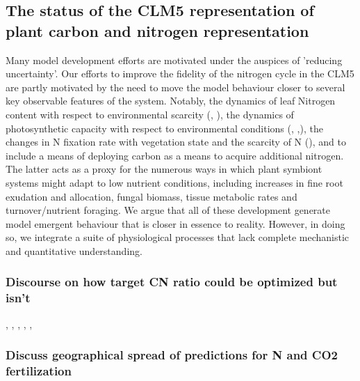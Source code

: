 \documentclass[draft,linenumbers]{agujournal}
\begin{document}
{\subsection{The status of the CLM5 representation of plant carbon and nitrogen representation}
Many model development efforts are motivated under the auspices of 'reducing uncertainty'.  Our efforts to improve the fidelity of the nitrogen cycle in the CLM5 are partly motivated by the need to move the model behaviour closer to several key observable features of the system. Notably, the dynamics of leaf Nitrogen content with respect to environmental scarcity (\cite{zaehle2014}, \cite{brzostek2014}), the dynamics of photosynthetic capacity with respect to environmental conditions (\cite{xu2012}, \cite{ali2016},\cite{rogers2017}), the changes in N fixation rate with vegetation state and the scarcity of N (\cite{vitousek2002}), and to include a means of deploying carbon as a means to acquire additional nitrogen. The latter acts as a proxy for the numerous ways in which plant symbiont systems might adapt to low nutrient conditions, including increases in fine root exudation and allocation, fungal biomass, tissue metabolic rates and turnover/nutrient foraging.  We argue that all of these development generate model emergent behaviour that is closer in essence to reality. However, in doing so, we integrate a suite of physiological processes that lack complete mechanistic and quantitative understanding.

\subsubsection{Discourse on how target CN ratio could be optimized but isn't}

\cite{thomas2014}, \cite{friedlingstein1999}, \cite{franklin2012}, \cite{mcmurtrie2013}, \cite{anten2011}, \cite{vanwijk2003}


\subsubsection{Discuss geographical spread of predictions for N and CO2 fertilization}

\cite{hickler2008}


}
\end{document}
